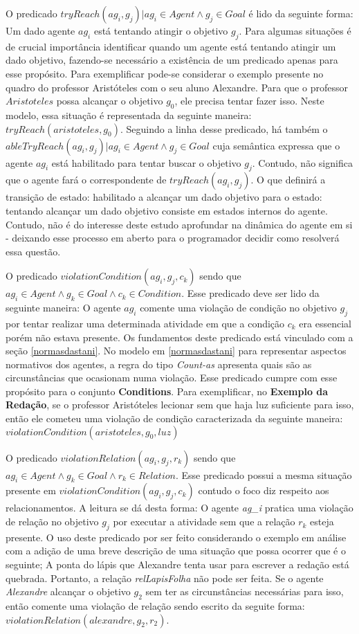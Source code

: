 O predicado $tryReach(ag_i,g_j) | ag_i \in Agent \wedge g_j \in Goal $ é lido da seguinte forma: Um dado agente $ag_i$ está tentando atingir o objetivo $g_j$. Para algumas situações é de crucial importância identificar quando um agente está tentando atingir um dado objetivo, fazendo-se necessário a existência de um predicado apenas para esse propósito. Para exemplificar pode-se considerar o exemplo presente no quadro do professor Aristóteles com o seu aluno Alexandre. Para que o professor $Aristoteles$ possa alcançar o objetivo $g_0$, ele precisa tentar fazer isso. Neste modelo, essa situação é representada da seguinte maneira: $tryReach(aristoteles,g_0)$. Seguindo a linha desse predicado, há também o $ableTryReach(ag_i,g_j) | ag_i \in Agent \wedge g_j \in Goal$ cuja semântica expressa que o agente $ag_i$ está habilitado para tentar buscar o objetivo $g_j$. Contudo, não significa que o agente fará o correspondente de $tryReach(ag_i,g_j)$. O que definirá a transição de estado: habilitado a alcançar um dado objetivo para o estado: tentando alcançar um dado objetivo consiste em estados internos do agente. Contudo, não é do interesse deste estudo aprofundar na dinâmica do agente em si - deixando esse processo em aberto para o programador decidir como resolverá essa questão.

O predicado $ violationCondition(ag_i,g_j,c_k) $ sendo que $ ag_i \in Agent \wedge g_k \in Goal \wedge c_k \in Condition$. Esse predicado deve ser lido da seguinte maneira: O agente $ag_i$ comente uma violação de condição no objetivo $g_j$ por tentar realizar uma determinada atividade em que a condição $c_k$ era essencial porém não estava presente. Os fundamentos deste predicado está vinculado com a seção \ref{normasdastani}. No modelo em \ref{normasdastani} para representar aspectos normativos dos agentes, a regra do tipo \textit{Count-as} apresenta quais são as circunstâncias que ocasionam numa violação. Esse predicado cumpre com esse propósito para o conjunto \textbf{Conditions}. Para exemplificar, no \textbf{Exemplo da Redação}, se o professor Aristóteles lecionar sem que haja luz suficiente para isso, então ele cometeu uma violação de condição caracterizada da seguinte maneira: $violationCondition(aristoteles,g_0,luz)$

O predicado $ violationRelation(ag_i,g_j,r_k) $ sendo que $ ag_i \in Agent \wedge g_k \in Goal \wedge r_k \in Relation $. Esse predicado possui a mesma situação presente em $ violationCondition(ag_i,g_j,c_k) $ contudo o foco diz respeito aos relacionamentos. A leitura se dá desta forma: O agente \textit{ag\_i} pratica uma violação de relação no objetivo $g_j$ por executar a atividade sem que a relação $r_k$ esteja presente. O uso deste predicado por ser feito considerando o exemplo em análise com a adição de uma breve descrição de uma situação que possa ocorrer que é o seguinte; A ponta do lápis que Alexandre tenta usar para escrever a redação está quebrada. Portanto, a relação \textit{relLapisFolha} não pode ser feita. Se o agente \textit{Alexandre} alcançar o objetivo $g_2$ sem ter as circunstâncias necessárias para isso, então comente uma violação de relação sendo escrito da seguite forma: $violationRelation(alexandre,g_2,r_2)$.

